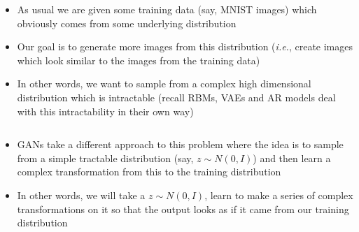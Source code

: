 {\begin{frame}
\begin{columns}
		\begin{overlayarea}{\textwidth}{\textheight}
			\begin{itemize}[<+->]\justifying
			\item As usual we are given some training data (say, MNIST images) which obviously comes from some underlying distribution
			\item Our goal is to generate more images from this distribution (\textit{i.e.}, create images which look similar to the images from the training data)
			\item In other words, we want to sample from a complex high dimensional distribution which is intractable (recall RBMs, VAEs and AR models deal with this intractability in their own way)

			\end{itemize}
		\end{overlayarea}
	\end{columns}
\end{frame}

\begin{frame}
		\begin{overlayarea}{\textwidth}{\textheight}
		\vspace*{5mm}
		\begin{center}
					
		\end{center}

			\begin{itemize}[<+->]\justifying
			\item GANs take a different approach to this problem where the idea is to sample from a simple tractable distribution (say, $z \sim N(0, I)$) and then learn a complex transformation from this to the training distribution
			\item In other words, we will take a $z \sim N(0,I)$, learn to make a series of complex transformations on it so that the output looks as if it came from our training distribution 
			
			\end{itemize}		
		\end{overlayarea}			
\end{frame}
\begin{frame}
	\begin{columns}
		\begin{overlayarea}{\textwidth}{\textheight}
			\vspace*{10mm}
			\begin{center}
						
			\end{center}		
		\end{overlayarea}


\end{columns}
\end{frame}}
